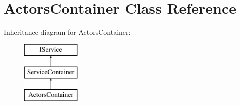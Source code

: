 \hypertarget{classActorsContainer}{}\section{Actors\+Container Class Reference}
\label{classActorsContainer}
Inheritance diagram for Actors\+Container\+:\begin{figure}[H]
\begin{center}
\leavevmode
\includegraphics[height=3.000000cm]{classActorsContainer}
\end{center}
\end{figure}

